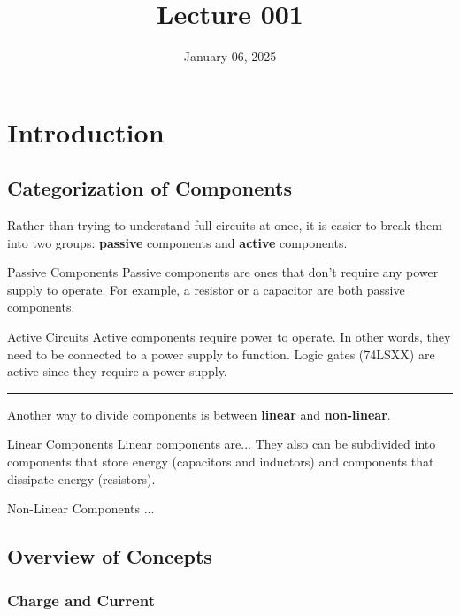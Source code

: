 \documentclass[12pt]{article}
\title{Lecture 001}
\date{January 06, 2025}
\begin{document}
\section{Introduction}
\label{sec:introduction}

\subsection{Categorization of Components}
\label{ssec:categorizationOfComponents}

Rather than trying to understand full circuits at once, it is easier to break them into two groups: \textbf{passive} components and \textbf{active} components.

\begin{definition}{Passive Components}
  Passive components are ones that don't require any power supply to operate. For example, a resistor or a capacitor are both passive components.
\end{definition}

\begin{definition}{Active Circuits}
  Active components require power to operate. In other words, they need to be connected to a power supply to function. Logic gates (74LSXX) are active since they require a power supply.
\end{definition}

\vspace{12pt}
\hrule
\vspace{08pt}

Another way to divide components is between \textbf{linear} and \textbf{non-linear}.

\begin{definition}{Linear Components}
  Linear components are... They also can be subdivided into components that store energy (capacitors and inductors) and components that dissipate energy (resistors).
\end{definition}

\begin{definition}{Non-Linear Components}
  ...
\end{definition}

\subsection{Overview of Concepts}
\label{ssec:overviewOfConcepts}

\subsubsection{Charge and Current}
\label{sssec:chargeAndCurrent}
\end{document}
